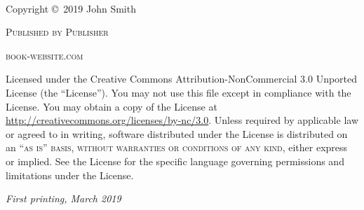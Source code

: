 \begingroup
    \thispagestyle{empty} %
    \vfill
\endgroup

\ifx\mostraCopyright\undefined
\else
    \newpage
    ~\vfill
    \thispagestyle{empty}
    \setlength{\parskip}{6pt}

    \noindent Copyright \copyright\ 2019 John Smith %

    \noindent \textsc{Published by Publisher} %

    \noindent \textsc{book-website.com} %

    \noindent Licensed under the Creative Commons Attribution-NonCommercial 3.0 Unported License (the ``License''). You may not use this file except in compliance with the License. You may obtain a copy of the License at \url{http://creativecommons.org/licenses/by-nc/3.0}. Unless required by applicable law or agreed to in writing, software distributed under the License is distributed on an \textsc{``as is'' basis, without warranties or conditions of any kind}, either express or implied. See the License for the specific language governing permissions and limitations under the License. %

    \noindent \textit{First printing, March 2019} %
\fi
